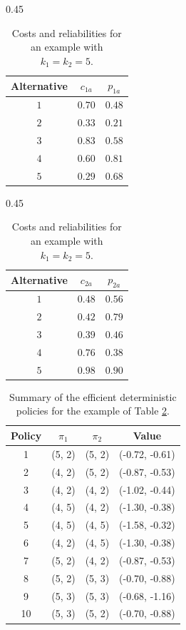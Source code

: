 \documentclass{article}
\theoremstyle{definition}
\numberwithin{equation}{section}
\begin{document}
\begin{table}[!ht]
\begin{subtable}[b]{0.45\linewidth}
\centering
\begin{tabular}{|| c c c ||}
\hline
Alternative & $c_{1a}$ & $p_{1a}$ \\ [0.5ex]
\hline\hline
$1$           & $0.70$      & $0.48$      \\
$2$           & $0.33$      & $0.21$      \\
$3$           & $0.83$      & $0.58$      \\
$4$           & $0.60$      & $0.81$      \\
$5$           & $0.29$      & $0.68$     \\ [1ex]
\hline
\end{tabular}
\caption{Component 1}
\end{subtable}
\begin{subtable}[b]{0.45\linewidth}
\centering
\begin{tabular}{|| c c c ||}
\hline
Alternative & $c_{2a}$ & $p_{2a}$ \\ [0.5ex]
\hline\hline
$1$           & $0.48$      & $0.56$      \\
$2$           & $0.42$      & $0.79$      \\
$3$           & $0.39$      & $0.46$      \\
$4$           & $0.76$      & $0.38$      \\
$5$           & $0.98$      & $0.90$     \\ [1ex]
\hline
\end{tabular}
\caption{Component 2}
\end{subtable}
\caption{Costs and reliabilities for an example with $k_1 = k_2 = 5$.}
\label{table:2}
\end{table}

\begin{table}[!ht]
\centering
\begin{tabular}{||c c c c||} 
 \hline
 Policy & $\pi_1$ & $\pi_2$ & Value\\ [0.5ex] 
 \hline\hline
 1 & (5, 2) & (5, 2) & (-0.72, -0.61) \\
 2 & (4, 2) & (5, 2) & (-0.87, -0.53) \\
 3 & (4, 2) & (4, 2) & (-1.02, -0.44) \\ 
 4 & (4, 5) & (4, 2) & (-1.30, -0.38) \\
 5 & (4, 5) & (4, 5) & (-1.58, -0.32) \\
 6 & (4, 2) & (4, 5) & (-1.30, -0.38) \\
 7 & (5, 2) & (4, 2) & (-0.87, -0.53) \\
 8 & (5, 2) & (5, 3) & (-0.70, -0.88) \\
 9 & (5, 3) & (5, 3) & (-0.68, -1.16) \\
 10 & (5, 3) & (5, 2) & (-0.70, -0.88) \\ [1ex]
 \hline
\end{tabular}
\caption{Summary of the efficient deterministic policies for the example of Table \ref{table:2}.}
\label{table:3}
\end{table}
\end{document}
